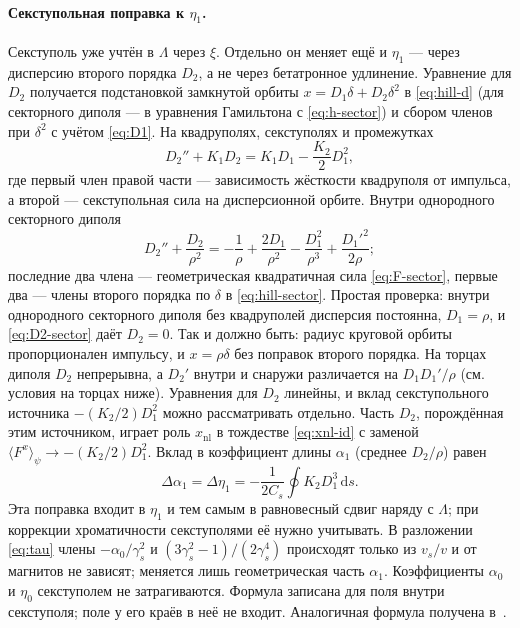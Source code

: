 \paragraph{Секступольная поправка к $\eta_1$.}
Секступоль уже учтён в $\Lambda$ через $\xi$. Отдельно он меняет ещё и $\eta_1$ --- через дисперсию второго порядка $D_2$, а не через бетатронное удлинение. Уравнение для $D_2$ получается подстановкой замкнутой орбиты $x=D_1\delta+D_2\delta^2$ в \eqref{eq:hill-d} (для секторного диполя --- в уравнения Гамильтона с \eqref{eq:h-sector}) и сбором членов при $\delta^2$ с учётом \eqref{eq:D1}. На квадруполях, секступолях и промежутках
\begin{equation}
\label{eq:D2-mag}
D_2''+K_1D_2=K_1D_1-\frac{K_2}{2}D_1^2,
\end{equation}
где первый член правой части --- зависимость жёсткости квадруполя от импульса, а второй --- секступольная сила на дисперсионной орбите. Внутри однородного секторного диполя
\begin{equation}
\label{eq:D2-sector}
D_2''+\frac{D_2}{\rho^2}=-\frac{1}{\rho}+\frac{2D_1}{\rho^2}-\frac{D_1^2}{\rho^3}+\frac{D_1'^2}{2\rho};
\end{equation}
последние два члена --- геометрическая квадратичная сила \eqref{eq:F-sector}, первые два --- члены второго порядка по $\delta$ в \eqref{eq:hill-sector}. Простая проверка: внутри однородного секторного диполя без квадруполей дисперсия постоянна, $D_1=\rho$, и \eqref{eq:D2-sector} даёт $D_2=0$. Так и должно быть: радиус круговой орбиты пропорционален импульсу, и $x=\rho\delta$ без поправок второго порядка. На торцах диполя $D_2$ непрерывна, а $D_2'$ внутри и снаружи различается на $D_1D_1'/\rho$ (см. условия на торцах ниже). Уравнения для $D_2$ линейны, и вклад секступольного источника $-(K_2/2)D_1^2$ можно рассматривать отдельно. Часть $D_2$, порождённая этим источником, играет роль $x_{\mathrm{nl}}$ в тождестве \eqref{eq:xnl-id} с заменой $\langle F^x\rangle_\psi\to-(K_2/2)D_1^2$. Вклад в коэффициент длины $\alpha_1$ (среднее $D_2/\rho$) равен
\begin{equation}
\label{eq:deta1-sext}
\Delta\alpha_1=\Delta\eta_1=-\frac{1}{2C_s}\oint K_2 D_1^3\,\mathrm{d}s.
\end{equation}
Эта поправка входит в $\eta_1$ и тем самым в равновесный сдвиг наряду с $\Lambda$; при коррекции хроматичности секступолями её нужно учитывать. В разложении \eqref{eq:tau} члены $-\alpha_0/\gamma_s^2$ и $(3\gamma_s^2-1)/(2\gamma_s^4)$ происходят только из $v_s/v$ и от магнитов не зависят; меняется лишь геометрическая часть $\alpha_1$. Коэффициенты $\alpha_0$ и $\eta_0$ секступолем не затрагиваются. Формула записана для поля внутри секступоля; поле у его краёв в неё не входит. Аналогичная формула получена в~\cite{Senichev2013}.

